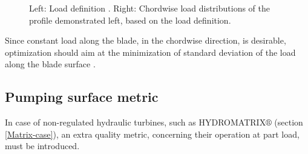 \begin{figure}[h!]
\begin{minipage}[b]{0.5\linewidth}
 \centering
\end{minipage}
\begin{minipage}[b]{0.5\linewidth}
 \centering
\end{minipage}
\caption{Left: Load definition . Right: Chordwise load distributions of the profile demonstrated left, based on the load definition.}
\label{design-obj}
\end{figure}

Since constant load along the blade, in the chordwise direction, is desirable, optimization should aim at the minimization of standard deviation of the load along the blade surface . 


\subsection{Pumping surface metric}
In case of non-regulated hydraulic turbines, such as HYDROMATRIX$\circledR$ (section \ref{Matrix-case}), an extra quality metric, concerning their operation at part load, must be introduced.      

